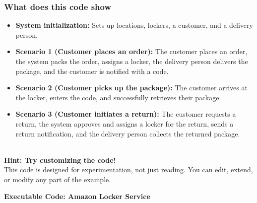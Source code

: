 \subsubsection{What does this code show}\label{SQClzMCthBeoDqkQKSqJa}

\begin{itemize}
\item
\protect{}\label{lZSH5-mzHIs8g6dW6Lcxy}
\textbf{System initialization:} Sets up locations, lockers, a customer, and a delivery person.
\item
\protect{}\label{Bj-rjzM7H9hSbNYXd1CAU}
\textbf{Scenario 1 (Customer places an order):} The customer places an order, the system packs the order, assigns a locker, the delivery person delivers the package, and the customer is notified with a code.
\item
\protect{}\label{QDaOr_ClfBb-eqXXd2527}
\textbf{Scenario 2 (Customer picks up the package):} The customer arrives at the locker, enters the code, and successfully retrieves their package.
\item
\protect{}\label{O7o2T6NduMuHyEo1DAlqH}
\textbf{Scenario 3 (Customer initiates a return):} The customer requests a return, the system approves and assigns a locker for the return, sends a return notification, and the delivery person collects the returned package.
\end{itemize}
\\
\textbf{Hint: Try customizing the code!}
\\
This code is designed for experimentation, not just reading. You can edit, extend, or modify any part of the example.

\textbf{Executable Code: Amazon Locker Service}

